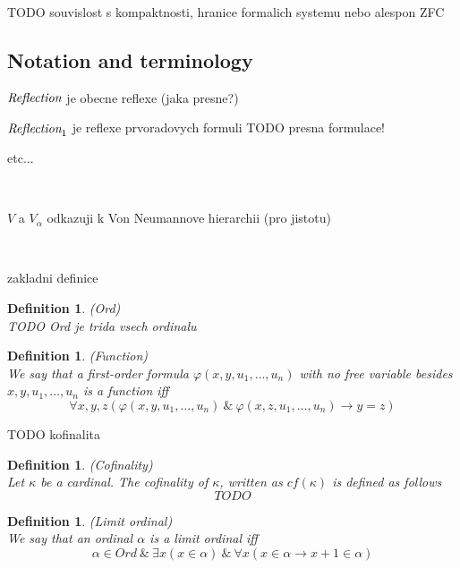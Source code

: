 \documentclass[12pt,a4paper]{article}
\newtheorem{definition}[theorem]{Definition}
\newcommand{\then}{\rightarrow}
\newcommand{\bce}{\begin{compactenum}}
\newcommand{\ece}{\end{compactenum}}
\begin{document}
TODO souvislost s kompaktnosti, hranice formalich systemu nebo alespon ZFC

\subsection{Notation and terminology}
\bce
\item $\emph{Reflection}$ je obecne reflexe (jaka presne?)
\item $\emph{Reflection}_1$ je reflexe prvoradovych formuli TODO presna formulace!
\item etc...
\ece

\

$V$ a $V_\alpha$ odkazuji k Von Neumannove hierarchii (pro jistotu)

\

zakladni definice

\begin{definition}{(Ord)}\\
TODO Ord je trida vsech ordinalu
\end{definition}

\begin{definition}{(Function)}\label{def:function}\\
We say that a first-order formula $\varphi(x, y, u_1, \ldots, u_n)$ with no free variable besides $x, y, u_1, \ldots, u_n$ is a \emph{function} iff
\begin{equation}
\forall x, y, z (\varphi(x, y, u_1, \ldots, u_n)\ \&\ \varphi(x, z, u_1, \ldots, u_n) \then y=z)
\end{equation}
\end{definition}

TODO kofinalita
\begin{definition}{(Cofinality)}\label{def:extensionality}\\
Let $\kappa$ be a cardinal. The {cofinality} of $\kappa$, written as $cf(\kappa)$ is defined as follows
\begin{equation}
TODO
\end{equation}
\end{definition}

\begin{definition}{(Limit ordinal)}\label{def:limit_ordinal}\\
We say that an ordinal $\alpha$ is a \emph{limit ordinal} iff
\begin{equation}
\alpha \in Ord\ \&\ \exists x (x\in\alpha)\ \&\ \forall x(x \in \alpha \then x+1 \in \alpha)
\end{equation}
\end{definition}
\end{document}
